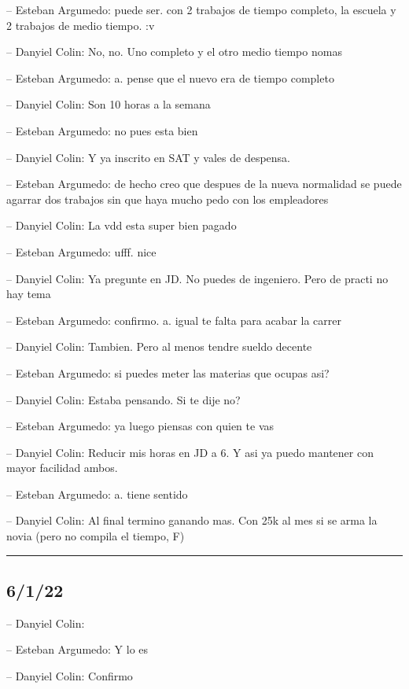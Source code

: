 -- Esteban Argumedo: puede ser. con 2 trabajos de tiempo completo, la
escuela y 2 trabajos de medio tiempo. :v

-- Danyiel Colin: No, no. Uno completo y el otro medio tiempo nomas

-- Esteban Argumedo: a. pense que el nuevo era de tiempo completo

-- Danyiel Colin: Son 10 horas a la semana

-- Esteban Argumedo: no pues esta bien

-- Danyiel Colin: Y ya inscrito en SAT y vales de despensa.

-- Esteban Argumedo: de hecho creo que despues de la nueva normalidad se
puede agarrar dos trabajos sin que haya mucho pedo con los empleadores

-- Danyiel Colin: La vdd esta super bien pagado

-- Esteban Argumedo: ufff. nice

-- Danyiel Colin: Ya pregunte en JD. No puedes de ingeniero. Pero de
practi no hay tema

-- Esteban Argumedo: confirmo. a. igual te falta para acabar la carrer

-- Danyiel Colin: Tambien. Pero al menos tendre sueldo decente

-- Esteban Argumedo: si puedes meter las materias que ocupas asi?

-- Danyiel Colin: Estaba pensando. Si te dije no?

-- Esteban Argumedo: ya luego piensas con quien te vas

-- Danyiel Colin: Reducir mis horas en JD a 6. Y asi ya puedo mantener
con mayor facilidad ambos.

-- Esteban Argumedo: a. tiene sentido

-- Danyiel Colin: Al final termino ganando mas. Con 25k al mes si se
arma la novia (pero no compila el tiempo, F)

\begin{center}\rule{0.5\linewidth}{0.5pt}\end{center}

\hypertarget{section-91}{%
\subsection{6/1/22}\label{section-91}}

-- Danyiel Colin:

-- Esteban Argumedo: Y lo es

-- Danyiel Colin: Confirmo

